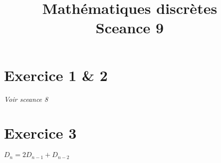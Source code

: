 \documentclass[fontsize=10pt]{article}
\title{\textbf{Mathématiques discrètes}\\ Sceance 9}
\date{}
\newcommand\tab[1][1cm]{\hspace*{#1}}
\begin{document}
\maketitle %

\section*{Exercice 1 \& 2}

\textit{Voir sceance 8}\\

\section*{Exercice 3}
\tab $D_{n} = 2D_{n-1}+D_{n-2}$\\
 
\end{document}
